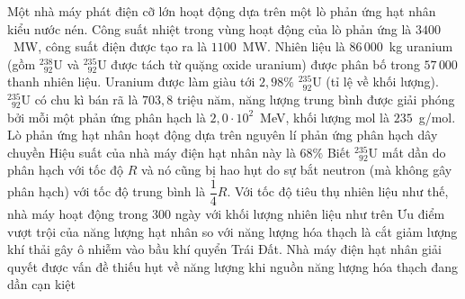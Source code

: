 	\begin{ex}%
		Một nhà máy phát điện cỡ lớn hoạt động dựa trên một lò phản ứng hạt nhân kiểu nước nén. Công suất nhiệt trong vùng hoạt động của lò phản ứng là $3400$~MW, công suất điện được tạo ra là $1100$~MW. Nhiên liệu là $86\,000$~kg uranium (gồm ${}^{238}_{\phantom{2}92}\text{U}$ và ${}^{235}_{\phantom{2}92}\text{U}$ được tách từ quặng oxide uranium) được phân bố trong $57\,000$ thanh nhiên liệu. Uranium được làm giàu tới $2{,}98\%$ ${}^{235}_{\phantom{2}92}\text{U}$ (tỉ lệ về khối lượng). ${}^{235}_{\phantom{2}92}\text{U}$ có chu kì bán rã là $703{,}8$ triệu năm, năng lượng trung bình được giải phóng bởi mỗi một phản ứng phân hạch là $2{,}0\cdot 10^2$~MeV, khối lượng mol là $235$~g/mol.
		\choiceTFt
		{\True Lò phản ứng hạt nhân hoạt động dựa trên nguyên lí phản ứng phân hạch dây chuyền}
		{Hiệu suất của nhà máy điện hạt nhân này là $68\%$}
		{Biết ${}^{235}_{\phantom{2}92}\text{U}$ mất dần do phân hạch với tốc độ $R$ và nó cũng bị hao hụt do sự bắt neutron (mà không gây phân hạch) với tốc độ trung bình là $\dfrac{1}{4}R$. Với tốc độ tiêu thụ nhiên liệu như thế, nhà máy hoạt động trong $300$ ngày với khối lượng nhiên liệu như trên}
		{\True Ưu điểm vượt trội của năng lượng hạt nhân so với năng lượng hóa thạch là cắt giảm lượng khí thải gây ô nhiễm vào bầu khí quyển Trái Đất. Nhà máy điện hạt nhân giải quyết được vấn đề thiếu hụt về năng lượng khi nguồn năng lượng hóa thạch đang dần cạn kiệt}
	\end{ex}

